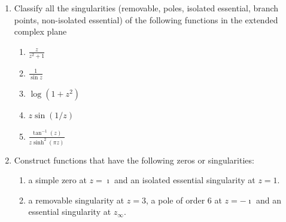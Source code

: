 {\begin{Exercise}
\end{Exercise}



\begin{Exercise}
  \label{exercise classify z z2+1}
\begin{enumerate}
\item 
  Classify all the singularities (removable, poles, isolated essential,
  branch points, non-isolated essential) of the following 
  functions in the extended complex plane
  \begin{enumerate}
  \item 
    $\displaystyle \frac{z}{z^2 + 1}$
  \item 
    $\displaystyle \frac{1}{\sin z}$
  \item 
    $\displaystyle \log \left( 1 + z^2 \right)$
  \item 
    $\displaystyle z \sin(1/z)$
  \item 
    $\displaystyle \frac{ \tan^{-1}(z)}{z \sinh^2(\pi z)}$
  \end{enumerate}
\item 
  Construct functions that have the following zeros or singularities:
  \begin{enumerate}
  \item 
    a simple zero at $z = \imath$ and an isolated essential singularity at $z = 1$.
  \item 
    a removable singularity at $z = 3$, a pole of order 6 at $z = - \imath$ 
    and an essential singularity at $z_\infty$.
  \end{enumerate}
\end{enumerate}

\end{Exercise}










\raggedbottom
}
